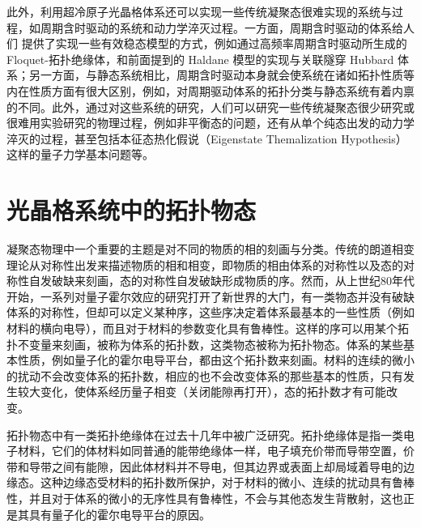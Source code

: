 
此外，利用超冷原子光晶格体系还可以实现一些传统凝聚态很难实现的系统与过程，如周期含时驱动的系统和动力学淬灭过程。一方面，周期含时驱动的体系给人们 提供了实现一些有效稳态模型的方式，例如通过高频率周期含时驱动所生成的 Floquet-拓扑绝缘体\cite{floq-ti-2011}，和前面提到的 Haldane 模型的实现\cite{haldane-expr-2014}与关联隧穿 Hubbard 体系\cite{floq-hubb-expr-2018,correlated-tunnel-expr-2018-shaking}；另一方面，与静态系统相比，周期含时驱动本身就会使系统在诸如拓扑性质等内在性质方面有很大区别，例如，对周期驱动体系的拓扑分类与静态系统有着内禀的不同\cite{floq-edgestate-2013-prx}。此外，通过对这些系统的研究，人们可以研究一些传统凝聚态很少研究或很难用实验研究的物理过程，例如非平衡态的问题，还有从单个纯态出发的动力学淬灭的过程，甚至包括本征态热化假说（Eigenstate Themalization Hypothesis）\cite{thermalize-entropy-2016}这样的量子力学基本问题等。




\section{光晶格系统中的拓扑物态}


凝聚态物理中一个重要的主题是对不同的物质的相的刻画与分类。传统的朗道相变理论从对称性出发来描述物质的相和相变，即物质的相由体系的对称性以及态的对称性自发破缺来刻画，态的对称性自发破缺形成物质的序。然而，从上世纪80年代开始，一系列对量子霍尔效应的研究打开了新世界的大门，有一类物态并没有破缺体系的对称性，但却可以定义某种序，这些序决定着体系最基本的一些性质（例如材料的横向电导），而且对于材料的参数变化具有鲁棒性。这样的序可以用某个拓扑不变量来刻画，被称为体系的拓扑数，这类物态被称为拓扑物态。体系的某些基本性质，例如量子化的霍尔电导平台，都由这个拓扑数来刻画。材料的连续的微小的扰动不会改变体系的拓扑数，相应的也不会改变体系的那些基本的性质，只有发生较大变化，使体系经历量子相变（关闭能隙再打开），态的拓扑数才有可能改变。

拓扑物态中有一类拓扑绝缘体在过去十几年中被广泛研究\cite{topo2010hasan}。拓扑绝缘体是指一类电子材料，它们的体材料如同普通的能带绝缘体一样，电子填充价带而导带空置，价带和导带之间有能隙，因此体材料并不导电，但其边界或表面上却局域着导电的边缘态。这种边缘态受材料的拓扑数所保护，对于材料的微小、连续的扰动具有鲁棒性，并且对于体系的微小的无序性具有鲁棒性，不会与其他态发生背散射，这也正是其具有量子化的霍尔电导平台的原因。

